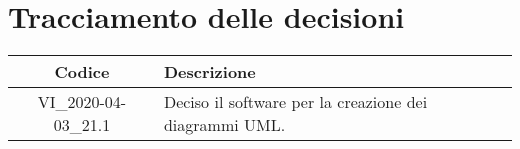 \section*{Tracciamento delle decisioni}

\begin{center}
	\begin{longtable}{|c|p{12.25cm}|}
		\hline
		\rowcolor{lighter-grayer}
		\textbf{Codice} & \textbf{Descrizione} \\
		\hline
		\endfirsthead

		\hline
		VI\_2020-04-03\_21.1 & Deciso il software per la creazione dei diagrammi UML. \\
		\hline

	\end{longtable}
\end{center}
